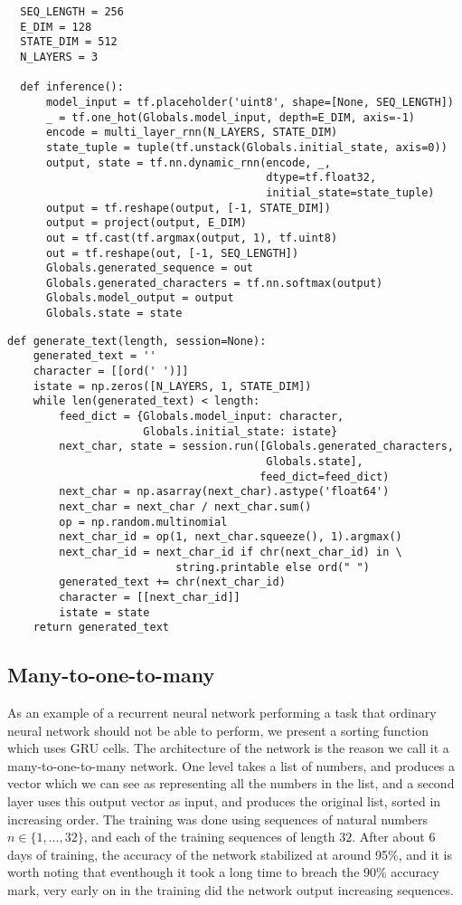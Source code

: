 \documentclass[10pt]{amsart}
\theoremstyle{definition}
\begin{document}
\begin{verbatim}
  SEQ_LENGTH = 256
  E_DIM = 128
  STATE_DIM = 512
  N_LAYERS = 3

  def inference():
      model_input = tf.placeholder('uint8', shape=[None, SEQ_LENGTH])
      _ = tf.one_hot(Globals.model_input, depth=E_DIM, axis=-1)
      encode = multi_layer_rnn(N_LAYERS, STATE_DIM)
      state_tuple = tuple(tf.unstack(Globals.initial_state, axis=0))
      output, state = tf.nn.dynamic_rnn(encode, _,
                                        dtype=tf.float32,
                                        initial_state=state_tuple)
      output = tf.reshape(output, [-1, STATE_DIM])
      output = project(output, E_DIM)
      out = tf.cast(tf.argmax(output, 1), tf.uint8)
      out = tf.reshape(out, [-1, SEQ_LENGTH])
      Globals.generated_sequence = out
      Globals.generated_characters = tf.nn.softmax(output)
      Globals.model_output = output
      Globals.state = state
\end{verbatim}

\begin{verbatim}
def generate_text(length, session=None):
    generated_text = ''
    character = [[ord(' ')]]
    istate = np.zeros([N_LAYERS, 1, STATE_DIM])
    while len(generated_text) < length:
        feed_dict = {Globals.model_input: character,
                     Globals.initial_state: istate}
        next_char, state = session.run([Globals.generated_characters,
                                        Globals.state],
                                       feed_dict=feed_dict)
        next_char = np.asarray(next_char).astype('float64')
        next_char = next_char / next_char.sum()
        op = np.random.multinomial
        next_char_id = op(1, next_char.squeeze(), 1).argmax()
        next_char_id = next_char_id if chr(next_char_id) in \
                          string.printable else ord(" ")
        generated_text += chr(next_char_id)
        character = [[next_char_id]]
        istate = state
    return generated_text
\end{verbatim}

\subsection{Many-to-one-to-many}

As an example of a recurrent neural network performing a task that ordinary neural network
should not be able to perform, we present a sorting function which uses GRU cells. The architecture
of the network is the reason we call it a many-to-one-to-many network.  One level takes a list
of numbers, and produces a vector which we can see as representing all the numbers in the list,
and a second layer uses this output vector as input, and produces the original list, sorted in
increasing order. The training was done using sequences of natural numbers $n\in\{1,...,32\}$, and each
of the training sequences of length $32$.  After about 6 days of training, the accuracy of the network
stabilized at around 95\%, and it is worth noting that eventhough it took a long time to breach
the 90\% accuracy mark, very early on in the training did the network output increasing sequences.
\end{document}
